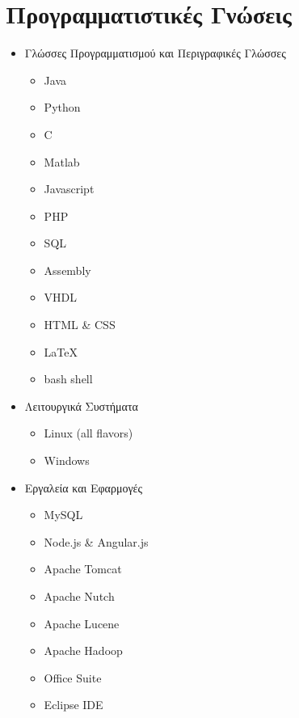 \documentclass[print]{keros-cv} %
\begin{document}
\newpage
\section{Προγραμματιστικές Γνώσεις}
\begin{itemize}
\item Γλώσσες Προγραμματισμού και Περιγραφικές Γλώσσες
\begin{itemize}
\item[] Java
\item[] Python
\item[] C
\item[] Matlab
\item[] Javascript
\item[] PHP
\item[] SQL
\item[] Assembly
\item[] VHDL
\item[] HTML \& CSS
\item[] LaTeX
\item[] bash shell
\end{itemize}
\item Λειτουργικά Συστήματα
\begin{itemize}
\item[] Linux (all flavors)
\item[] Windows
\end{itemize}
\item Εργαλεία και Εφαρμογές
\begin{itemize}
\item[] MySQL
\item[] Node.js \& Angular.js
\item[] Apache Tomcat
\item[] Apache Nutch
\item[] Apache Lucene
\item[] Apache Hadoop
\item[] Office Suite
\item[] Eclipse IDE
\end{itemize}
\end{itemize}

\end{document}
